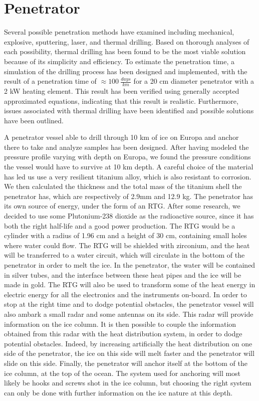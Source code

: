 \section{Penetrator}
Several possible penetration methods have examined including mechanical, explosive, sputtering, laser, and thermal drilling. Based on thorough analyses of each possibility, thermal drilling has been found to be the most viable solution because of its simplicity and efficiency. To estimate the penetration time, a simulation of the drilling process has been designed and implemented, with the result of a penetration time of $\approx \SI{100}{\frac{days}{km}}$ for a 20 cm diameter penetrator with a 2 kW heating element. This result has been verified using generally accepted approximated equations, indicating that this result is realistic. Furthermore, issues associated with thermal drilling have been identified and possible solutions have been outlined.

A penetrator vessel able to drill through 10 km of ice on Europa and anchor there to take and analyze samples has been designed. After having modeled the pressure profile varying with depth on Europa, we found the pressure conditions the vessel would have to survive at 10 km depth. A careful choice of the material has led us use a very resilient titanium alloy, which is also resistant to corrosion. We then calculated the thickness and the total mass of the titanium shell the penetrator has, which are respectively of 2.9mm and 12.9 kg.
The penetrator has its own source of energy, under the form of an RTG. After some research, we decided to use some Plutonium-238 dioxide as the radioactive source, since it has both the right half-life and a good power production. The RTG would be a cylinder with a radius of 1.96 cm  and a height of 30 cm, containing small holes where water could flow. The RTG will be shielded with zirconium, and the heat will be transferred to a water circuit, which will circulate in the bottom of the penetrator in order to melt the ice. In the penetrator, the water will be contained in silver tubes, and the interface between these heat pipes and the ice will be made in gold.
The RTG will also be used to transform some of the heat energy in electric energy for all the electronics and the instruments on-board.
In order to stop at the right time and to dodge potential obstacles, the penetrator vessel will also ambark a small  radar and some antennas on its side. This radar will provide information on the ice column. It is then possible to couple the information obtained from this radar with the heat distribution system, in order to dodge potential obstacles. Indeed, by increasing artificially the heat distribution on one side of the penetrator, the ice on this side  will melt faster and the penetrator will slide on this side.
Finally, the penetrator will anchor itself at the bottom of the ice column, at the top of the ocean. The system used for anchoring will most likely be hooks and screws shot in the ice column, but choosing the right system can only be done with further information on the ice nature at this depth.

